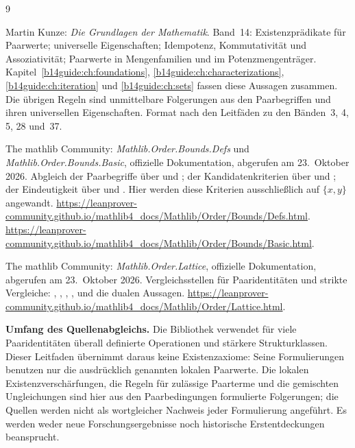 \renewcommand{\bibname}{Quellen und Bandzuordnung}
\begin{thebibliography}{9}
\footnotesize
\setlength{\itemsep}{6pt}
\setlength{\parskip}{0pt}

Martin Kunze: \emph{Die Grundlagen der Mathematik}.
Band~14: Existenzprädikate für Paarwerte; universelle Eigenschaften;
Idempotenz, Kommutativität und Assoziativität; Paarwerte in
Mengenfamilien und im Potenzmengenträger.
Kapitel~\ref{b14guide:ch:foundations},
\ref{b14guide:ch:characterizations},
\ref{b14guide:ch:iteration} und \ref{b14guide:ch:sets}
fassen diese Aussagen zusammen.
Die übrigen Regeln sind unmittelbare Folgerungen aus den
Paarbegriffen und ihren universellen Eigenschaften.
Format nach den Leitfäden zu den Bänden~3, 4, 5, 28 und~37.

The mathlib Community: \emph{Mathlib.Order.Bounds.Defs}
und \emph{Mathlib.Order.Bounds.Basic}, offizielle Dokumentation,
abgerufen am 23.~Oktober 2026.
Abgleich der Paarbegriffe über  und ;
der Kandidatenkriterien über  und
; der Eindeutigkeit über
 und .
Hier werden diese Kriterien ausschließlich auf $\{x,y\}$ angewandt.
\url{https://leanprover-community.github.io/mathlib4_docs/Mathlib/Order/Bounds/Defs.html}.
\url{https://leanprover-community.github.io/mathlib4_docs/Mathlib/Order/Bounds/Basic.html}.

The mathlib Community: \emph{Mathlib.Order.Lattice},
offizielle Dokumentation, abgerufen am 23.~Oktober 2026.
Vergleichsstellen für Paaridentitäten und strikte Vergleiche:
, , ,
, 
und die dualen Aussagen.
\url{https://leanprover-community.github.io/mathlib4_docs/Mathlib/Order/Lattice.html}.

\end{thebibliography}

\begingroup
\footnotesize
\noindent\textbf{Umfang des Quellenabgleichs.}
Die Bibliothek verwendet für viele Paaridentitäten überall
definierte Operationen und stärkere Strukturklassen.
Dieser Leitfaden übernimmt daraus keine Existenzaxiome:
Seine Formulierungen benutzen nur die ausdrücklich genannten
lokalen Paarwerte. Die lokalen Existenzverschärfungen, die
Regeln für zulässige Paarterme und die gemischten Ungleichungen
sind hier aus den Paarbedingungen formulierte Folgerungen;
die Quellen werden nicht als wortgleicher Nachweis jeder
Formulierung angeführt.
Es werden weder neue Forschungsergebnisse noch historische
Erstentdeckungen beansprucht.
\endgroup